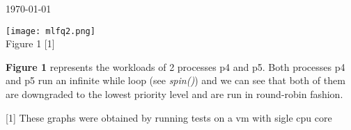 \documentclass[8pt]{article}
\begin{document}
\hfill \small{\today} \\
\begin{center}{\bf
{}
}\end{center}
\begin{center}{\texttt{[image: mlfq2.png]}} \\
{Figure 1 \footnotesize{[1]}} \\
\end{center}

\textbf{Figure 1} represents the workloads of 2 processes p4 and p5.
Both processes p4 and p5 run an infinite while loop (see \textit{spin()}) and we can see that both of them are downgraded to the lowest priority level and are run in round-robin fashion.



\vfill
\footnotesize{[1] These graphs were obtained by running tests on a vm with sigle cpu core} \\
\end{document}
